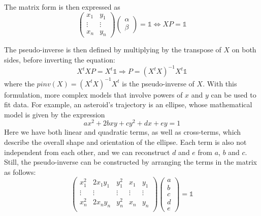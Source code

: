 The matrix form is then expressed as
\begin{equation}
    \begin{pmatrix}
        x_1 & y_1 \\
        \vdots & \vdots \\
        x_n & y_n 
    \end{pmatrix} 
    \begin{pmatrix}
        \alpha \\
        \beta
    \end{pmatrix}
    = \mathbb{1} 
    \Leftrightarrow
    X P = \mathbb{1}
\end{equation}

The pseudo-inverse is then defined by multiplying by the transpose of $X$ on both sides, before inverting the equation:
\begin{equation}
    X^t X P = X^t \mathbb{1} \Rightarrow P = (X^t X)^{-1} X^t \mathbb{1}
\end{equation}
where the $pinv(X) = (X^t X)^{-1} X^t$ is the pseudo-inverse of $X$. With this formulation, more complex models that involve powers of $x$ and $y$ can be used to fit data. For example, an asteroid's trajectory is an ellipse, whose mathematical model is given by the expression
\begin{equation}
    a x^2 + 2 b x y + c y^2 + d x + e y = 1
    \label{eq:conicSectionRotated}
\end{equation}
Here we have both linear and quadratic terms, as well as cross-terms, which describe the overall shape and orientation of the ellipse. Each term is also not independent from each other, and we can reconstruct $d$ and $e$ from $a$, $b$ and $c$. Still, the pseudo-inverse can be constructed by arranging the terms in the matrix as follows:
\begin{equation}
    \begin{pmatrix}
        x_1^2  & 2 x_1 y_1 & y_1^2  & x_1    & y_1 \\
        \vdots & \vdots    & \vdots & \vdots & \vdots \\
        x_n^2  & 2 x_n y_n & y_n^2  & x_n    & y_n \\
    \end{pmatrix}
    \begin{pmatrix}
        a \\ b \\ c \\ d \\ e 
    \end{pmatrix} = \mathbb{1} 
\end{equation}


